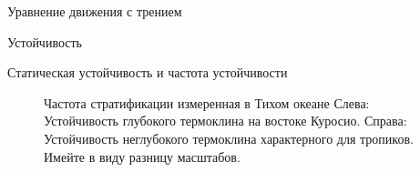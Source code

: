 \begin{chapter}{Уравнение движения с трением}
\begin{section}{Устойчивость}
\begin{paragraph}{Статическая устойчивость и частота устойчивости}
\begin{figure}[t!]
\caption{Частота стратификации измеренная в Тихом океане Слева:
Устойчивость глубокого термоклина на востоке Куросио. Справа:
Устойчивость неглубокого термоклина характерного для тропиков. Имейте
в виду разницу масштабов.}  
\label{fig:stabilityfreq}
\end{figure}
%


\end{paragraph}
\end{section}
\end{chapter}
